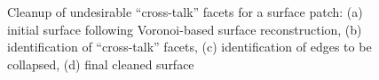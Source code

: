 \begin{figure}[htbp!]
{\label{fig:cross1-2}}
%
\caption{Cleanup of undesirable ``cross-talk'' facets for a surface patch: (a) initial surface following Voronoi-based surface reconstruction, (b) identification of ``cross-talk'' facets, (c) identification of edges to be collapsed, (d) final cleaned surface}
\label{fig:cross1}
\end{figure}

